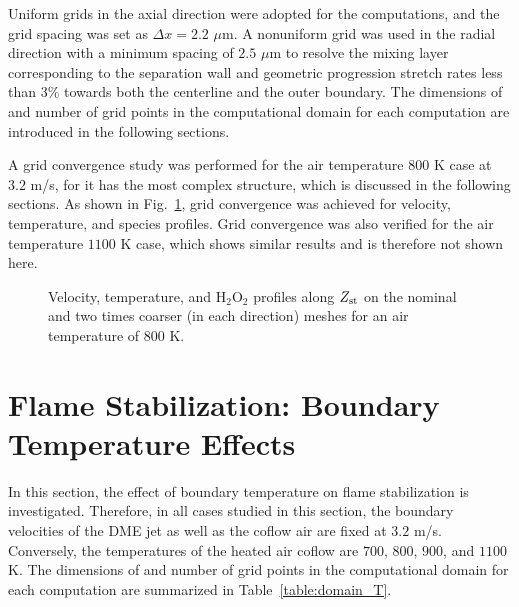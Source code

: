 Uniform grids in the axial direction were adopted for the computations, and the grid spacing was set as $\Delta x = 2.2$ $\mu$m.  A nonuniform grid was used in the radial direction with a minimum spacing of $2.5$ $\mu$m to resolve the mixing layer corresponding to the separation wall and geometric progression stretch rates less than $3$\% towards both the centerline and the outer boundary.  The dimensions of and number of grid points in the computational domain for each computation are introduced in the following sections.

A grid convergence study was performed for the air temperature $800$ K case at $3.2$ m/s, for it has the most complex structure, which is discussed in the following sections.  As shown in Fig.~\ref{fig:convergence}, grid convergence was achieved for velocity, temperature, and species profiles.  Grid convergence was also verified for the air temperature $1100$ K case, which shows similar results and is therefore not shown here.  

\begin{figure}
  \centering
  \scriptsize
  \scalebox{1.5}{}
  \scalebox{1.5}{}
  \scalebox{1.5}{}
  \caption{Velocity, temperature, and H$_2$O$_2$ profiles along $Z_{\rm st}$ on the nominal and two times coarser (in each direction) meshes for an air temperature of $800$ K.}
  \label{fig:convergence}
\end{figure}

\section{Flame Stabilization: Boundary Temperature Effects}\label{sec:dynamics-T}

In this section, the effect of boundary temperature on flame stabilization is investigated.  Therefore, in all cases studied in this section, the boundary velocities of the DME jet as well as the coflow air are fixed at $3.2$ m/s.  Conversely, the temperatures of the heated air coflow are $700$, $800$, $900$, and $1100$ K.  The dimensions of and number of grid points in the computational domain for each computation are summarized in Table~\ref{table:domain_T}. 

\begin{table}
  \caption{Computational domain and number of grid points for steady cases with the same flow velocities but different boundary temperatures.}
  \label{table:domain_T}
  \centering
  \normalsize
\end{table}

